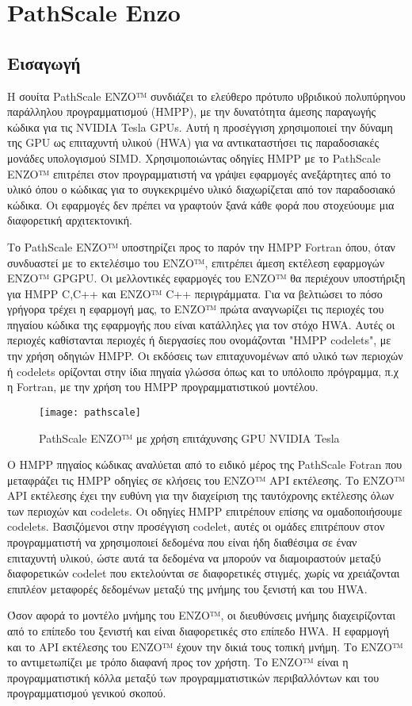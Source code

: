 \section{PathScale Enzo}
\subsection{Εισαγωγή}
Η σουίτα PathScale ENZO™ συνδιάζει το ελεύθερο πρότυπο υβριδικού πολυπύρηνου παράλληλου προγραμματισμού (HMPP), με την δυνατότητα άμεσης παραγωγής κώδικα για τις NVIDIA Tesla GPUs. Αυτή η προσέγγιση χρησιμοποιεί την δύναμη της GPU ως επιταχυντή υλικού (HWA) για να αντικαταστήσει τις παραδοσιακές μονάδες υπολογισμού SIMD. Χρησιμοποιώντας οδηγίες HMPP με το PathScale ENZO™ επιτρέπει στον προγραμματιστή να γράψει εφαρμογές ανεξάρτητες από το υλικό όπου ο κώδικας για το συγκεκριμένο υλικό διαχωρίζεται από τον παραδοσιακό κώδικα. Οι εφαρμογές δεν πρέπει να γραφτούν ξανά κάθε φορά που στοχεύουμε μια διαφορετική αρχιτεκτονική. 

Το PathScale ENZO™ υποστηρίζει προς το παρόν την HMPP Fortran όπου, όταν συνδυαστεί με το εκτελέσιμο του ENZO™, επιτρέπει άμεση εκτέλεση εφαρμογών ENZO™ GPGPU. Οι μελλοντικές εφαρμογές του ENZO™ θα περιέχουν υποστήριξη για HMPP C,C++ και ENZO™ C++ περιγράμματα. Για να βελτιώσει το πόσο γρήγορα τρέχει η εφαρμογή μας, το ENZO™ πρώτα αναγνωρίζει τις περιοχές του πηγαίου κώδικα της εφαρμογής που είναι κατάλληλες για τον στόχο HWA. Αυτές οι περιοχές καθίστανται περιοχές ή διεργασίες που ονομάζονται "HMPP codelets", με την χρήση οδηγιών HMPP. Οι εκδόσεις των επιταχυνομένων από υλικό των περιοχών ή codelets ορίζονται στην ίδια πηγαία γλώσσα όπως και το υπόλοιπο πρόγραμμα, π.χ η Fortran, με την χρήση του HMPP προγραμματιστικού μοντέλου.\cite{pathscale-1}

\begin{figure}[h]
	\texttt{[image: pathscale]}
	\centering
	\caption{PathScale ENZO™ με χρήση επιτάχυνσης GPU NVIDIA Tesla\cite{figure-6}}
\end{figure}


Ο HMPP πηγαίος κώδικας αναλύεται από το ειδικό μέρος της PathScale Fotran που μεταφράζει τις HMPP οδηγίες σε κλήσεις του ENZO™ API εκτέλεσης. Το ENZO™ API εκτέλεσης έχει την ευθύνη για την διαχείριση της ταυτόχρονης εκτέλεσης όλων των περιοχών και codelets. Οι οδηγίες HMPP επιτρέπουν επίσης να ομαδοποιήσουμε codelets. Βασιζόμενοι στην προσέγγιση codelet, αυτές οι ομάδες επιτρέπουν στον προγραμματιστή να χρησιμοποιεί δεδομένα που είναι ήδη διαθέσιμα σε έναν επιταχυντή υλικού, ώστε αυτά τα δεδομένα να μπορούν να διαμοιραστούν μεταξύ διαφορετικών codelet που εκτελούνται σε διαφορετικές στιγμές, χωρίς να χρειάζονται επιπλέον μεταφορές δεδομένων μεταξύ της μνήμης του ξενιστή και του HWA.

Όσον αφορά το μοντέλο μνήμης του ENZO™, οι διευθύνσεις μνήμης διαχειρίζονται από το επίπεδο του ξενιστή και είναι διαφορετικές στο επίπεδο HWA. Η εφαρμογή και το API εκτέλεσης του ENZO™ έχουν την δικιά τους τοπική μνήμη. Το ENZO™ το αντιμετωπίζει με τρόπο διαφανή προς τον χρήστη. Το ENZO™ είναι η προγραμματιστική κόλλα μεταξύ των προγραμματιστικών περιβαλλόντων και του προγραμματισμού γενικού σκοπού.


